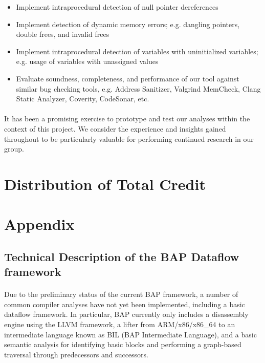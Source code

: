 \documentclass[letterpaper,11pt]{article}
\begin{document}
\begin{itemize}
  \item Implement intraprocedural detection of null pointer dereferences
  \item  Implement detection of dynamic memory errors; e.g. dangling pointers,
double frees, and invalid frees
\item Implement intraprocedural detection of variables with uninitialized
variables; e.g. usage of variables with unassigned values
\item Evaluate soundness, completeness, and performance of our tool
  against similar bug checking tools, e.g. Address Sanitizer, Valgrind
  MemCheck, Clang Static Analyzer, Coverity, CodeSonar, etc.
\end{itemize}

\paragraph{}
It has been a promising exercise to prototype and test our
analyses within the context of this project. We consider the experience and
insights gained throughout to be particularly valuable for performing continued
research in our group. 

\section{Distribution of Total Credit}

\clearpage

\appendix
\section{Appendix}
\label{appa1}
\subsection{Technical Description of the BAP Dataflow framework}

\paragraph{}
Due to the preliminary status of the current BAP framework, a number of common
compiler analyses have not yet been implemented, including a basic dataflow
framework. In particular, BAP currently only includes a disassembly engine
using the LLVM framework, a lifter from ARM/x86/x86\_64 to an intermediate
language known as BIL (BAP Intermediate Language), and a basic semantic
analysis for identifying basic blocks and performing a graph-based traversal
through predecessors and successors.
\end{document}
